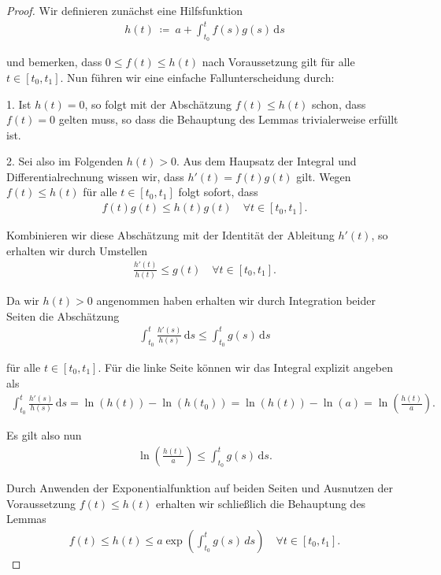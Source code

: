 \documentclass[letterpaper,10pt,german]{jupyterBook}
\begin{document}
\begin{proof}
 Wir definieren zunächst eine Hilfsfunktion
\begin{align*}
h(t) \ \coloneqq \ a + \int_{t_0}^t f(s)g(s)\, \mathrm{d}s
\end{align*}
\par
und bemerken, dass \(0 \leq f(t) \leq h(t)\) nach Voraussetzung gilt für alle \(t \in [t_0, t_1]\).
Nun führen wir eine einfache Fallunterscheidung durch:

\par
1. Ist \(h(t)=0\), so folgt mit der Abschätzung \(f(t) \leq h(t)\) schon, dass \(f(t) = 0\) gelten muss, so dass die Behauptung des Lemmas trivialerweise erfüllt ist.

\par
2. Sei also im Folgenden \(h(t) > 0\).
Aus dem Haupsatz der Integral  und Differentialrechnung wissen wir, dass \(h'(t) = f(t)g(t)\) gilt.
Wegen \(f(t) \leq h(t)\) für alle \(t \in [t_0, t_1]\) folgt sofort, dass
\begin{align*}
f(t)g(t) \leq h(t)g(t) \quad \forall t \in [t_0,t_1].
\end{align*}
\par
Kombinieren wir diese Abschätzung mit der Identität der Ableitung \(h'(t)\), so erhalten wir durch Umstellen
\begin{align*}
\frac{h'(t)}{h(t)} \leq g(t) \quad \forall t \in [t_0, t_1].
\end{align*}
\par
Da wir \(h(t) > 0\) angenommen haben erhalten wir durch Integration beider Seiten die Abschätzung
\begin{align*}
\int_{t_0}^t \frac{h'(s)}{h(s)} \, \mathrm{d}s \leq \int_{t_0}^t g(s) \, \mathrm{d}s\end{align*}
\par
für alle \(t \in [t_0, t_1]\).
Für die linke Seite können wir das Integral explizit angeben als
\begin{align*}
\int_{t_0}^t \frac{h'(s)}{h(s)} \, \mathrm{d}s = \ln(h(t)) - \ln(h(t_0)) = \ln(h(t)) - \ln(a) = \ln\left(\frac{h(t)}{a}\right).
\end{align*}
\par
Es gilt also nun
\begin{align*}
\ln \left(\frac{h(t)}{a}\right) \leq \int_{t_0}^t g(s)\, \mathrm{d}s.
\end{align*}
\par
Durch Anwenden der Exponentialfunktion auf beiden Seiten und Ausnutzen der Voraussetzung \(f(t) \leq h(t)\) erhalten wir schließlich die Behauptung des Lemmas
\begin{align*}
 f(t) \leq h(t)\leq a \exp{\left( \int_{t_0}^t g(s)\, ds \right)} \quad \forall t \in [t_0,t_1].
\end{align*}\end{proof}
\end{document}

